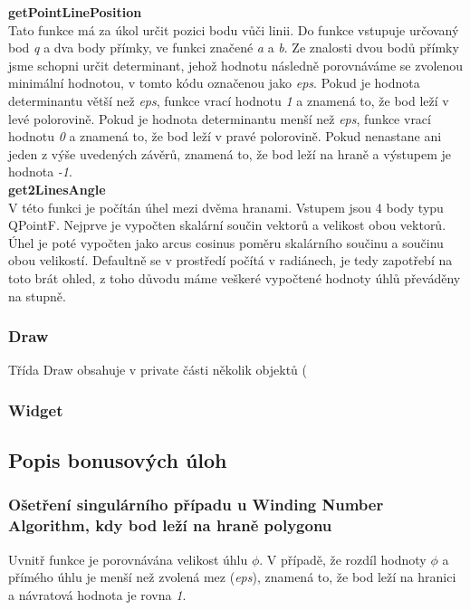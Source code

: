 \documentclass[a4paper, 12pt]{article}
\begin{document}
\textbf{getPointLinePosition}\\
Tato funkce má za úkol určit pozici bodu vůči linii. Do funkce vstupuje určovaný bod \textit{q} a dva body přímky, ve funkci značené \textit{a} a \textit{b}. Ze znalosti dvou bodů přímky jsme schopni určit determinant, jehož hodnotu následně porovnáváme se zvolenou minimální hodnotou, v tomto kódu označenou jako \textit{eps}. Pokud je hodnota determinantu větší než \textit{eps}, funkce vrací hodnotu \textit{1} a znamená to, že bod leží v levé polorovině. Pokud je hodnota determinantu menší než \textit{eps}, funkce vrací hodnotu \textit{0} a znamená to, že bod leží v pravé polorovině. Pokud nenastane ani jeden z výše uvedených závěrů, znamená to, že bod leží na hraně a výstupem je hodnota \textit{-1}.\\

\textbf{get2LinesAngle}\\
V této funkci je počítán úhel mezi dvěma hranami. Vstupem jsou 4 body typu QPointF. Nejprve je vypočten skalární součin vektorů a velikost obou vektorů. Úhel je poté vypočten jako arcus cosinus poměru skalárního součinu a součinu obou velikostí. Defaultně se v prostředí počítá v radiánech, je tedy zapotřebí na toto brát ohled, z toho důvodu máme veškeré vypočtené hodnoty úhlů převáděny na stupně. \\


\subsubsection{Draw}
Třída Draw obsahuje v private části několik objektů (

\subsubsection{Widget}

\subsection{Popis bonusových úloh}
\subsubsection{Ošetření singulárního případu u Winding Number Algorithm, kdy bod leží na hraně polygonu}
Uvnitř funkce je porovnávána velikost úhlu $\phi$. V případě, že rozdíl hodnoty $\phi$ a přímého úhlu je menší než zvolená mez (\textit{eps}), znamená to, že bod leží na hranici a návratová hodnota je rovna  \textit{1}.
\end{document}
